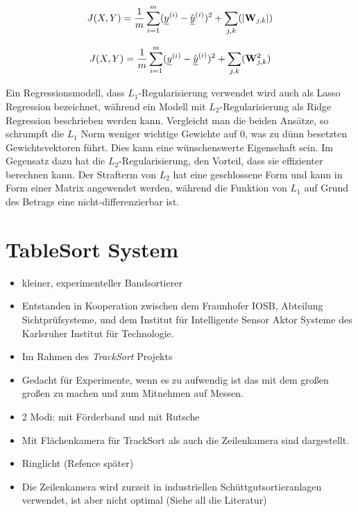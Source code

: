 \begin{equation} \label{eqn:MSE-L1}
	J(X, Y) = \frac{1}{m} \sum_{i=1}^{m} ({\underline{y}}^{(i)} - \hat{{\underline{y}}}^{(i)})^2 + \sum_{j, k} (|{{\mathbf{W}}}_{j,k}|)
\end{equation} 

\begin{equation} \label{eqn:MSE-L2}
	J(X, Y) = \frac{1}{m} \sum_{i=1}^{m} ({\underline{y}}^{(i)} - \hat{{\underline{y}}}^{(i)})^2 + \sum_{j, k} ({{\mathbf{W}}}_{j,k}^2)
\end{equation} 


Ein Regressionsmodell, dass \(L_1\)-Regularisierung verwendet wird auch als Lasso Regression bezeichnet, 
während ein Modell mit \(L_2\)-Regularisierung als Ridge Regression beschrieben werden kann.
Vergleicht man die beiden Ansätze, so schrumpft die \(L_1\) Norm weniger wichtige Gewichte auf 0, was zu dünn besetzten Gewichtsvektoren führt.
Dies kann eine wünschenswerte Eigenschaft sein.
Im Gegensatz dazu hat die \(L_2\)-Regularisierung, den Vorteil, dass sie effizienter berechnen kann.
Der Strafterm von \(L_2\) hat eine geschlossene Form und kann in Form einer Matrix angewendet werden, während die Funktion von \(L_1\) auf Grund des Betrags eine nicht-differenzierbar ist.




\color{black}
\section{TableSort System}


\begin{itemize}
	\item kleiner, experimenteller Bandsortierer \cite{doll2015}
	\item Entstanden in Kooperation zwischen dem Fraunhofer IOSB, Abteilung Sichtprüfsysteme, und dem Institut für Intelligente Sensor Aktor Systeme des Karlsruher Institut für Technologie.
	\item Im Rahmen des \textit{TrackSort} Projekts
	\item Gedacht für Experimente, wenn es zu aufwendig ist das mit dem großen großen zu machen und zum Mitnehmen auf Messen.
	\item 2 Modi: mit Förderband und mit Rutsche
	\item Mit Flächenkamera für TrackSort als auch die Zeilenkamera sind dargestellt.
	\item Ringlicht (Refence später)
	\item Die Zeilenkamera wird zurzeit in industriellen Schüttgutsortieranlagen verwendet, ist aber nicht optimal (Siehe all die Literatur)

\end{itemize}

